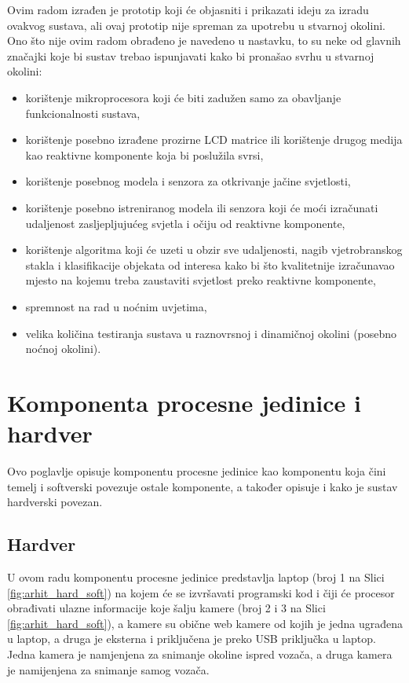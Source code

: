 \documentclass{foi}
\begin{document}
Ovim radom izrađen je prototip koji će objasniti i prikazati ideju za izradu ovakvog sustava, ali ovaj prototip nije spreman za upotrebu u stvarnoj okolini. Ono što nije ovim radom obrađeno je navedeno u nastavku, to su neke od glavnih značajki koje bi sustav trebao ispunjavati kako bi pronašao svrhu u stvarnoj okolini:
\begin{itemize}[noitemsep]
    \item korištenje mikroprocesora koji će biti zadužen samo za obavljanje funkcionalnosti sustava,
    \item korištenje posebno izrađene prozirne LCD matrice ili korištenje drugog medija kao reaktivne komponente koja bi poslužila svrsi,
    \item korištenje posebnog modela i senzora za otkrivanje jačine svjetlosti,
    \item korištenje posebno istreniranog modela ili senzora koji će moći izračunati udaljenost zasljepljujućeg svjetla i očiju od reaktivne komponente,
    \item korištenje algoritma koji će uzeti u obzir sve udaljenosti, nagib vjetrobranskog stakla i klasifikacije objekata od interesa kako bi što kvalitetnije izračunavao mjesto na kojemu treba zaustaviti svjetlost preko reaktivne komponente,
    \item spremnost na rad u noćnim uvjetima,
    \item velika količina testiranja sustava u raznovrsnoj i dinamičnoj okolini (posebno noćnoj okolini).
\end{itemize}

\section{Komponenta procesne jedinice i hardver}

Ovo poglavlje opisuje komponentu procesne jedinice kao komponentu koja čini temelj i softverski povezuje ostale komponente, a također opisuje i kako je sustav hardverski povezan.

\subsection{Hardver}
U ovom radu komponentu procesne jedinice predstavlja laptop (broj 1 na Slici \ref{fig:arhit_hard_soft}) na kojem će se izvršavati programski kod i čiji će procesor obrađivati ulazne informacije koje šalju kamere (broj 2 i 3 na Slici \ref{fig:arhit_hard_soft}), a kamere su obične web kamere od kojih je jedna ugrađena u laptop, a druga je eksterna i priključena je preko USB priključka u laptop. Jedna kamera je namjenjena za snimanje okoline ispred vozača, a druga kamera je namijenjena za snimanje samog vozača.
\end{document}
